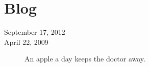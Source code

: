 \section{Blog}

\begin{description}
\item[September 17, 2012]
{


}
\item[April 22, 2009]
{
An apple a day keeps the doctor away.
}
\end{description}
